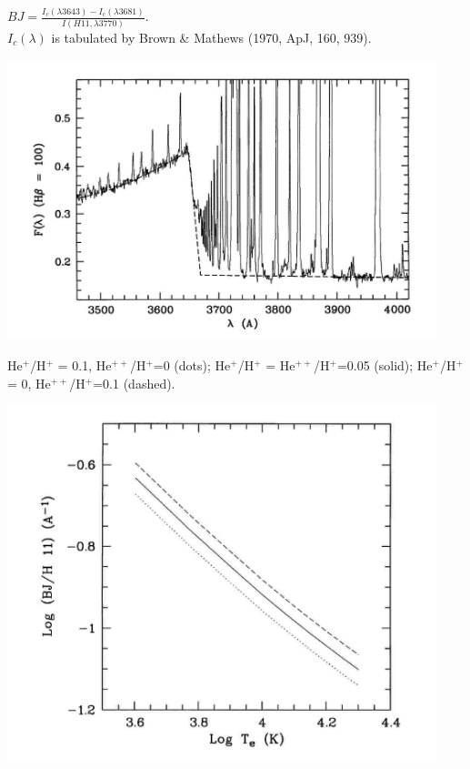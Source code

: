 \begin{minipage}[t]{13cm}
$BJ = \frac{I_c(\lambda3643)-I_c(\lambda3681)}{I(H11,\lambda3770)}.$
\\ $I_c(\lambda)$ is tabulated by Brown \& Mathews (1970, ApJ, 160,
939).

\begin{center}
  \includegraphics[width=12.5cm,height=!]{./C/bj_liu.jpg} \end{center}
\end{minipage}
\hfill
\begin{minipage}[t]{13cm}
He$^+$/H$^+$ = 0.1, He$^{++}$/H$^+$=0 (dots);
He$^+$/H$^+$ = He$^{++}$/H$^+$=0.05   (solid);
He$^+$/H$^+$ = 0, He$^{++}$/H$^+$=0.1   (dashed).
  \begin{center}
    \includegraphics[width=12.5cm,height=!]{./C/BJ_T.jpg}
  \end{center}
\end{minipage}

